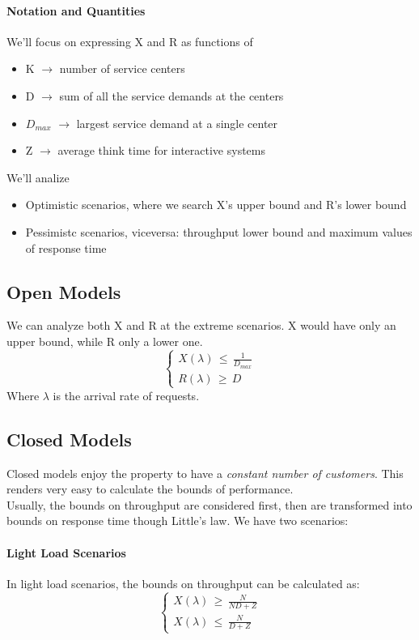 \documentclass[10pt,a4paper]{article}
\begin{document}
			\paragraph{Notation and Quantities}
				We'll focus on expressing X and R as functions of
				\begin{itemize}
					\item K $\rightarrow$ number of service centers
					\item D $\rightarrow$ sum of all the service demands at the centers
					\item $D_{max}$ $\rightarrow$ largest service demand at a single center
					\item Z $\rightarrow$ average think time for interactive systems
				\end{itemize}
				We'll analize
				\begin{itemize}
					\item Optimistic scenarios, where we search X's upper bound and R's lower bound
					\item Pessimistc scenarios, viceversa: throughput lower bound and maximum values of response time
				\end{itemize}
			
			\subsection{Open Models}
				We can analyze both X and R at the extreme scenarios. X would have only an upper bound, while R only a lower one.
				\begin{equation}
					\begin{cases}
						X(\lambda) \,\leq\, \frac{1}{D_{max}}\\
						R(\lambda) \,\geq\, D
					\end{cases}
				\end{equation}
				Where $\lambda$ is the arrival rate of requests.
				
			\subsection{Closed Models}
				Closed models enjoy the property to have a \emph{constant number of customers}. This renders very easy to calculate the bounds of performance.\\
				Usually, the bounds on throughput are considered first, then are transformed into bounds on response time though Little's law. We have two scenarios:
				
				\paragraph{Light Load Scenarios}
					In light load scenarios, the bounds on throughput can be calculated as:
					\begin{equation}
						\begin{cases}
							X(\lambda) \,\geq\, \frac{N}{ND + Z}\\
							X(\lambda) \,\leq\, \frac{N}{D + Z}
						\end{cases}
					\end{equation}
				
\end{document}
